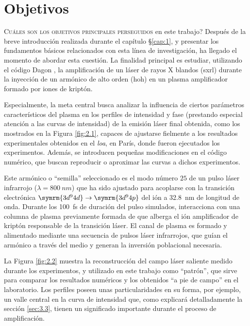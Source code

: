 \chapter{Objetivos}\label{cap:2}
\lettrine{C}{uáles son los objetivos principales perseguidos} en este trabajo? Después de la breve introducción realizada durante el capítulo \S\ref{cap:1}, y presentar los fundamentos básicos relacionados con esta línea de investigación, ha llegado el momento de abordar esta cuestión. La finalidad principal es estudiar, utilizando el código Dagon \autocite{Oliva2017}, la amplificación de un láser de rayos X blandos (\acrshort{sxrl}) durante la inyección de un armónico de alto orden (\acrshort{hoh}) en un plasma amplificador formado por iones de kriptón.

Especialmente, la meta central busca analizar la influencia de ciertos parámetros característicos del plasma en los perfiles de intensidad y fase (prestando especial atención a las curvas de intensidad) de la emisión láser final obtenida, como los mostrados en la Figura \ref{fig:2.1}, capaces de ajustarse fielmente a los resultados experimentales obtenidos en el \emph{\acrfull{loa}}, en París, donde fueron ejecutados los experimentos. Además, se introducen pequeñas modificaciones en el código numérico, que buscan reproducir o aproximar las curvas a dichos experimentos.

Este armónico o \enquote{semilla} seleccionado es el modo número $25$ de un pulso láser infrarrojo ($\lambda = \qty{800}{nm}$) que ha sido ajustado para acoplarse con la transición electrónica $\symrm{3d^{9}4d} \rightarrow \symrm{3d^{9}4p}$ del ión  a \qty{32.8}{nm} de longitud de onda. Durante los \qty{100}{fs} de duración del pulso simulados, interacciona con una columna de plasma previamente formada de  que alberga el ión amplificador de kriptón  responsable de la transición láser. El canal de plasma es formado y alimentado mediante una secuencia de pulsos láser infrarrojos, que guían el armónico a través del medio y generan la inversión poblacional necesaria.

La Figura \ref{fig:2.2} muestra la reconstrucción del campo láser saliente medido durante los experimentos, y utilizado en este trabajo como \enquote{patrón}, que sirve para comparar los resultados numéricos y los obtenidos \enquote{a pie de campo} en el laboratorio. Los perfiles poseen unas particularidades en su forma, por ejemplo, un valle central en la curva de intensidad que, como explicará detalladamente la sección \ref{sec:3.3}, tienen un significado importante durante el proceso de amplificación.

